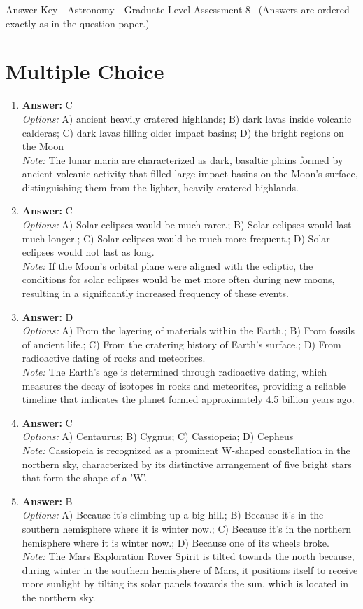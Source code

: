 \documentclass[12pt]{article}
\begin{document}
\begin{center}
Answer Key - Astronomy - Graduate Level Assessment 8 \
\small (Answers are ordered exactly as in the question paper.)
\end{center}

\section*{Multiple Choice}
\begin{enumerate}[label=\arabic*.]
\item \textbf{Answer:} C
\\ \textit{Options:} A) ancient heavily cratered highlands; B) dark lavas inside volcanic calderas; C) dark lavas filling older impact basins; D) the bright regions on the Moon
\\ \textit{Note:} The lunar maria are characterized as dark, basaltic plains formed by ancient volcanic activity that filled large impact basins on the Moon's surface, distinguishing them from the lighter, heavily cratered highlands.
\item \textbf{Answer:} C
\\ \textit{Options:} A) Solar eclipses would be much rarer.; B) Solar eclipses would last much longer.; C) Solar eclipses would be much more frequent.; D) Solar eclipses would not last as long.
\\ \textit{Note:} If the Moon's orbital plane were aligned with the ecliptic, the conditions for solar eclipses would be met more often during new moons, resulting in a significantly increased frequency of these events.
\item \textbf{Answer:} D
\\ \textit{Options:} A) From the layering of materials within the Earth.; B) From fossils of ancient life.; C) From the cratering history of Earth's surface.; D) From radioactive dating of rocks and meteorites.
\\ \textit{Note:} The Earth's age is determined through radioactive dating, which measures the decay of isotopes in rocks and meteorites, providing a reliable timeline that indicates the planet formed approximately 4.5 billion years ago.
\item \textbf{Answer:} C
\\ \textit{Options:} A) Centaurus; B) Cygnus; C) Cassiopeia; D) Cepheus
\\ \textit{Note:} Cassiopeia is recognized as a prominent W-shaped constellation in the northern sky, characterized by its distinctive arrangement of five bright stars that form the shape of a 'W'.
\item \textbf{Answer:} B
\\ \textit{Options:} A) Because it's climbing up a big hill.; B) Because it's in the southern hemisphere where it is winter now.; C) Because it's in the northern hemisphere where it is winter now.; D) Because one of its wheels broke.
\\ \textit{Note:} The Mars Exploration Rover Spirit is tilted towards the north because, during winter in the southern hemisphere of Mars, it positions itself to receive more sunlight by tilting its solar panels towards the sun, which is located in the northern sky.
\end{enumerate}
\end{document}
